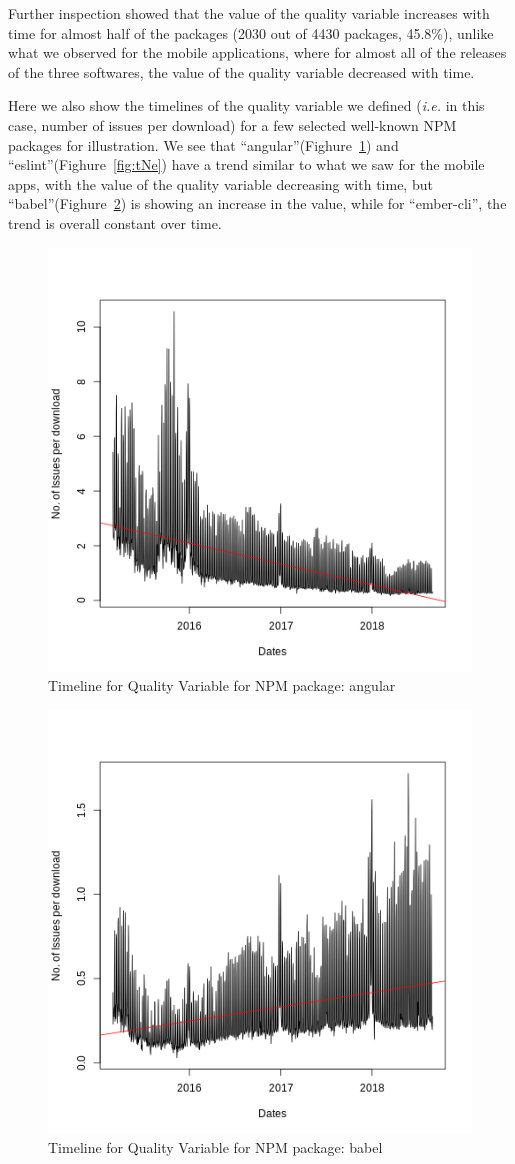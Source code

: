 \documentclass[smallextended]{svjour3}       %
\begin{document}
Further inspection showed that the value of the quality variable increases with time for almost half of the packages (2030 out of 4430 packages, 45.8\%), unlike what we observed for the mobile applications, where for almost all of the releases of the three softwares, the value of the quality variable decreased with time.

Here we also show the timelines of the quality variable we defined (\emph{i.e.} in this case, number of issues per download) for a few selected well-known NPM packages for illustration. We see that ``angular''(Fighure~\ref{fig:tNa}) and ``eslint''(Fighure~\ref{fig:tNe}) have a trend similar to what we saw for the mobile apps, with the value of the quality variable decreasing with time, but ``babel''(Fighure~\ref{fig:tNb}) is showing an increase in the value, while for ``ember-cli'', the trend is overall constant over time.

\begin{figure}[!t]
\centering
\includegraphics[width=0.5\linewidth]{angular}
\caption{Timeline for Quality Variable for NPM package: angular}
\label{fig:tNa}
\end{figure}

\begin{figure}[!t]
\centering
\includegraphics[width=0.5\linewidth]{babel}
\caption{Timeline for Quality Variable for NPM package: babel}
\label{fig:tNb}
\end{figure}
\end{document}

